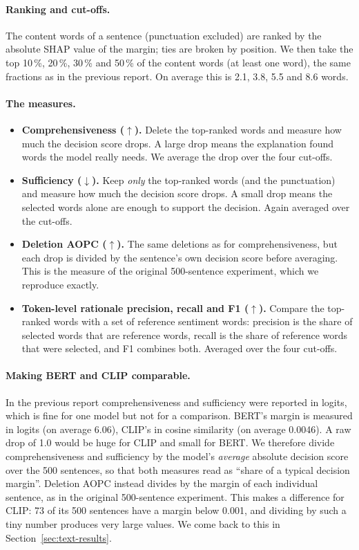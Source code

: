 \documentclass[11pt,a4paper]{article}
\newcommand{\up}{$\uparrow$}
\newcommand{\down}{$\downarrow$}
\begin{document}
\paragraph{Ranking and cut-offs.} The content words of a sentence (punctuation excluded)
are ranked by the absolute SHAP value of the margin; ties are broken by position. We then
take the top 10\,\%, 20\,\%, 30\,\% and 50\,\% of the content words (at least one word),
the same fractions as in the previous report. On average this is 2.1, 3.8, 5.5 and 8.6
words.

\paragraph{The measures.}
\begin{itemize}[leftmargin=*]
  \item \textbf{Comprehensiveness (\up).} Delete the top-ranked words and measure how much
        the decision score drops. A large drop means the explanation found words the model
        really needs. We average the drop over the four cut-offs.
  \item \textbf{Sufficiency (\down).} Keep \emph{only} the top-ranked words (and the
        punctuation) and measure how much the decision score drops. A small drop means the
        selected words alone are enough to support the decision. Again averaged over the
        cut-offs.
  \item \textbf{Deletion AOPC (\up).} The same deletions as for comprehensiveness, but each
        drop is divided by the sentence's own decision score before averaging. This is the
        measure of the original 500-sentence experiment, which we reproduce exactly.
  \item \textbf{Token-level rationale precision, recall and F1 (\up).} Compare the
        top-ranked words with a set of reference sentiment words: precision is the share of
        selected words that are reference words, recall is the share of reference words
        that were selected, and F1 combines both. Averaged over the four cut-offs.
\end{itemize}

\paragraph{Making BERT and CLIP comparable.} In the previous report comprehensiveness and
sufficiency were reported in logits, which is fine for one model but not for a comparison.
BERT's margin is measured in logits (on average 6.06), CLIP's in cosine similarity (on
average 0.0046). A raw drop of 1.0 would be huge for CLIP and small for BERT. We therefore
divide comprehensiveness and sufficiency by the model's \emph{average} absolute decision
score over the 500 sentences, so that both measures read as ``share of a typical decision
margin''. Deletion AOPC instead divides by the margin of each individual sentence, as in
the original 500-sentence experiment. This makes a difference for CLIP: 73 of its 500
sentences have a margin below 0.001, and dividing by such a tiny number produces very large
values. We come back to this in Section~\ref{sec:text-results}.
\end{document}

